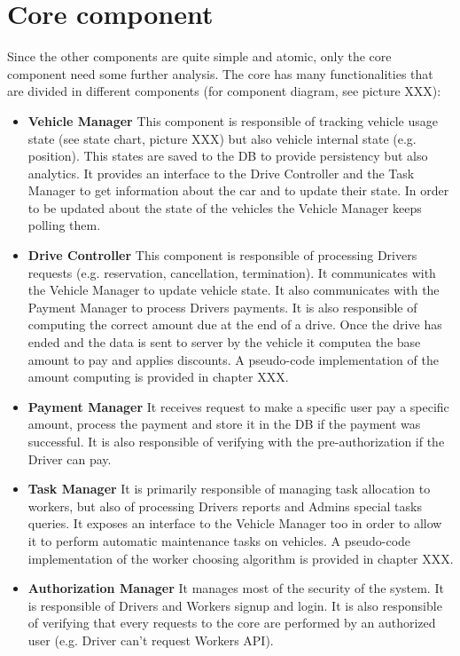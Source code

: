 \section {Core component}
Since the other components are quite simple and atomic, only the core component need some further analysis. The core has many functionalities that are divided in different components (for component diagram, see picture XXX):
\begin{itemize}
\item \textbf{Vehicle Manager} This component is responsible of tracking vehicle usage state (see state chart, picture XXX) but also vehicle internal state (e.g. position). This states are saved to the DB to provide persistency but also analytics. It provides an interface to the Drive Controller and the Task Manager to get information about the car and to update their state. In order to be updated about the state of the vehicles the Vehicle Manager keeps polling them.
\item \textbf{Drive Controller} This component is responsible of processing Drivers requests (e.g. reservation, cancellation, termination). It communicates with the Vehicle Manager to update vehicle state. It also communicates with the Payment Manager to process Drivers payments. It is also responsible of computing the correct amount due at the end of a drive. Once the drive has ended and the data is sent to server by the vehicle it computea the base amount to pay and applies discounts. A pseudo-code implementation of the amount computing is provided in chapter XXX.
\item \textbf{Payment Manager} It receives request to make a specific user pay a specific amount, process the payment and store it in the DB if the payment was successful. It is also responsible of verifying with the pre-authorization if the Driver can pay. 
\item \textbf{Task Manager} It is primarily responsible of managing task allocation to workers, but also of processing Drivers reports and Admins special tasks queries. It exposes an interface to the Vehicle Manager too in order to allow it to perform automatic maintenance tasks on vehicles. A pseudo-code implementation of the worker choosing algorithm is provided in chapter XXX.
\item \textbf{Authorization Manager} It manages most of the security of the system. It is responsible of Drivers and Workers signup and login. It is also responsible of verifying that every requests to the core are performed by an authorized user (e.g. Driver can't request Workers API). 
\end{itemize}

